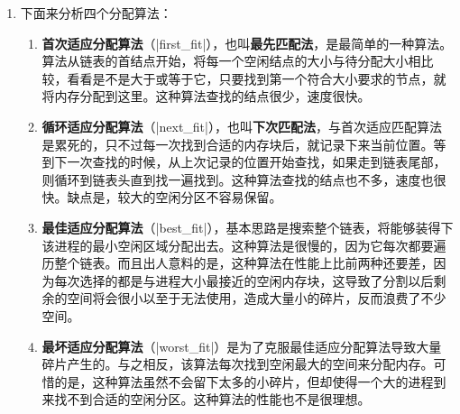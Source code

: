 \documentclass[c5size,a4paper,nofonts]{ctexart}
\begin{document}
\begin{enumerate}
\item 下面来分析四个分配算法：
\begin{enumerate}
\item {\bf 首次适应分配算法}（|first_fit|），也叫{\bf 最先匹配法}，是最简单的一种算法。算法从链表的首结点开始，将每一个空闲结点的大小与待分配大小相比较，看看是不是大于或等于它，只要找到第一个符合大小要求的节点，就将内存分配到这里。这种算法查找的结点很少，速度很快。
\item {\bf 循环适应分配算法}（|next_fit|），也叫{\bf 下次匹配法}，与首次适应匹配算法是累死的，只不过每一次找到合适的内存块后，就记录下来当前位置。等到下一次查找的时候，从上次记录的位置开始查找，如果走到链表尾部，则循环到链表头直到找一遍找到。这种算法查找的结点也不多，速度也很快。缺点是，较大的空闲分区不容易保留。
\item {\bf 最佳适应分配算法}（|best_fit|），基本思路是搜索整个链表，将能够装得下该进程的最小空闲区域分配出去。这种算法是很慢的，因为它每次都要遍历整个链表。而且出人意料的是，这种算法在性能上比前两种还要差，因为每次选择的都是与进程大小最接近的空闲内存块，这导致了分割以后剩余的空间将会很小以至于无法使用，造成大量小的碎片，反而浪费了不少空间。
\item {\bf 最坏适应分配算法}（|worst_fit|）是为了克服最佳适应分配算法导致大量碎片产生的。与之相反，该算法每次找到空闲最大的空间来分配内存。可惜的是，这种算法虽然不会留下太多的小碎片，但却使得一个大的进程到来找不到合适的空闲分区。这种算法的性能也不是很理想。
\end{enumerate}

\end{enumerate}
\end{document}
